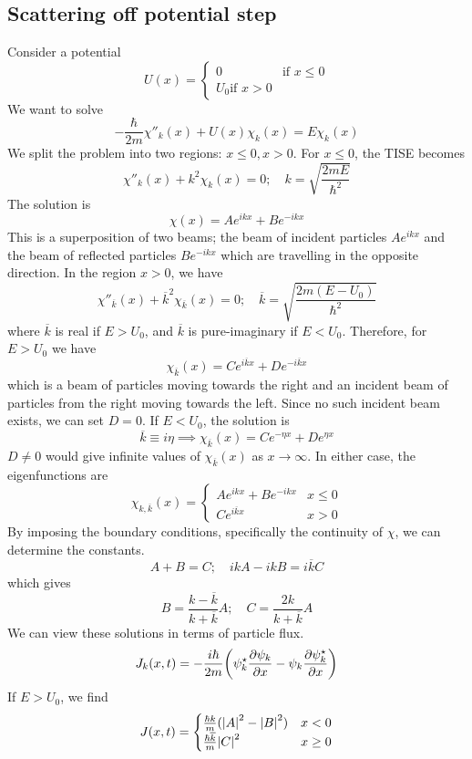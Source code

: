 \subsection{Scattering off potential step}
Consider a potential
\[ U(x) =
	\begin{cases}
		0 & \text{if } x \leq 0 \\
		U_0 \text{if } x > 0
	\end{cases}
\]
We want to solve
\[ -\frac{\hbar}{2m} \chi''_k(x) + U(x) \chi_k(x) = E\chi_k(x) \]
We split the problem into two regions: \( x \leq 0, x > 0 \).
For \( x \leq 0 \), the TISE becomes
\[ \chi''_k(x) + k^2 \chi_k(x) = 0;\quad k = \sqrt{\frac{2mE}{\hbar^2}} \]
The solution is
\[ \chi(x) = Ae^{ikx} + Be^{-ikx} \]
This is a superposition of two beams; the beam of incident particles \( Ae^{ikx} \) and the beam of reflected particles \( Be^{-ikx} \) which are travelling in the opposite direction.
In the region \( x > 0 \), we have
\[ \chi''_{\overline k}(x) + \overline k^2 \chi_{\overline k}(x) = 0;\quad \overline k = \sqrt{\frac{2m(E-U_0)}{\hbar^2}} \]
where \( \overline k \) is real if \( E > U_0 \), and \( \overline k \) is pure-imaginary if \( E < U_0 \).
Therefore, for \( E > U_0 \) we have
\[ \chi_{\overline k}(x) = Ce^{i \overline k x} + De^{-i \overline k x} \]
which is a beam of particles moving towards the right and an incident beam of particles from the right moving towards the left.
Since no such incident beam exists, we can set \( D = 0 \).
If \( E < U_0 \), the solution is
\[ \overline k \equiv i \eta \implies \chi_{\overline k}(x) = Ce^{-\eta x} + De^{\eta x} \]
\( D \neq 0 \) would give infinite values of \( \chi_{\overline k}(x) \) as \( x \to \infty \).
In either case, the eigenfunctions are
\[ \chi_{k, \overline k}(x) =
	\begin{cases}
		Ae^{ikx} + Be^{-ikx} & x \leq 0 \\
		Ce^{i \overline k x} & x > 0
	\end{cases}
\]
By imposing the boundary conditions, specifically the continuity of \( \chi \), we can determine the constants.
\[ A + B = C;\quad ikA - ikB = i\overline k C \]
which gives
\[ B = \frac{k - \overline k}{k + \overline k} A;\quad C = \frac{2k}{k + \overline k}A \]
We can view these solutions in terms of particle flux.
\[ J_k(x,t) = - \frac{i\hbar}{2m} \qty(\psi^\star_k \pdv{\psi_k}{x} - \psi_k \pdv{\psi_k^\star}{x}) \]
If \( E > U_0 \), we find
\[ J(x,t) =
	\begin{cases}
		\frac{\hbar k}{m} (\abs{A}^2 - \abs{B}^2) & x < 0 \\
		\frac{\hbar \overline k}{m} \abs{C}^2 & x \geq 0
	\end{cases}
\]
